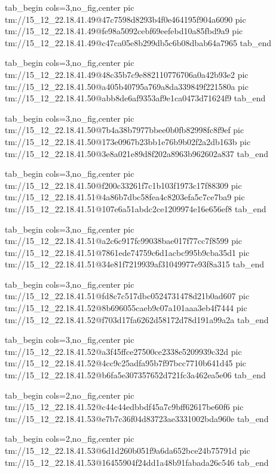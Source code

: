 \ifcmt
  tab_begin cols=3,no_fig,center
    pic tm://15_12_22.18.41.49@47c7598d8293b4f0e464195f904a6090
    pic tm://15_12_22.18.41.49@fe98a5092cebf69eefebd10a85fbd9a9
    pic tm://15_12_22.18.41.49@c47ca05e8b299db5c6b08dbab64a7965
  tab_end
\fi


\ifcmt
  tab_begin cols=3,no_fig,center
    pic tm://15_12_22.18.41.49@48c35b7c9e882110776706a0a42b93e2
    pic tm://15_12_22.18.41.50@a405b40795a769a8da339849f221580a
    pic tm://15_12_22.18.41.50@abb8de6af9353af9e1ca0473d71624f9
  tab_end
\fi


\ifcmt
  tab_begin cols=3,no_fig,center
    pic tm://15_12_22.18.41.50@7b4a38b7977bbee0b0fb82998fc8f9ef
    pic tm://15_12_22.18.41.50@173e0967b23bb1e76b9b02f2a2db163b
    pic tm://15_12_22.18.41.50@3e8a021e89d8f202a8963b962602a837
  tab_end
\fi


\ifcmt
  tab_begin cols=3,no_fig,center
    pic tm://15_12_22.18.41.50@f200c33261f7c1b103f1973c17f88309
    pic tm://15_12_22.18.41.51@4a86b7dbc58fea4c8203efa5c7ce7ba9
    pic tm://15_12_22.18.41.51@107e6a51abdc2ce1209974e16e656ef8
  tab_end
\fi


\ifcmt
  tab_begin cols=3,no_fig,center
    pic tm://15_12_22.18.41.51@a2c6c917fc99038bae017f77cc7f8599
    pic tm://15_12_22.18.41.51@7861ede74759c6d1acbc995b9cba35d1
    pic tm://15_12_22.18.41.51@34e81f7219939af31049977e93f8a315
  tab_end
\fi


\ifcmt
  tab_begin cols=3,no_fig,center
    pic tm://15_12_22.18.41.51@fd8c7c517dbc0524731478d21b0ad607
    pic tm://15_12_22.18.41.52@8b696055caeb9c07a101aaa3eb4f7444
    pic tm://15_12_22.18.41.52@f703d17fa6262d58172d78d191a99a2a
  tab_end
\fi


\ifcmt
  tab_begin cols=3,no_fig,center
    pic tm://15_12_22.18.41.52@a3f45ffce27500ce2338e5209939c32d
    pic tm://15_12_22.18.41.52@4cc9c25adfa95b7f97bcc7710b641d45
    pic tm://15_12_22.18.41.52@b6fa5e307357652d721fc3a462ea5e06
  tab_end
\fi


\ifcmt
  tab_begin cols=2,no_fig,center
    pic tm://15_12_22.18.41.52@c44c44edbbdf45a7c9bff62617be60f6
    pic tm://15_12_22.18.41.53@e7b7c36f04d83723ae3331002bda960e
  tab_end
\fi


\ifcmt
  tab_begin cols=2,no_fig,center
    pic tm://15_12_22.18.41.53@6d1d260b051f9a6da652bce24b75791d
    pic tm://15_12_22.18.41.53@16455904f24dd1a48b91fabada26c546
  tab_end
\fi

